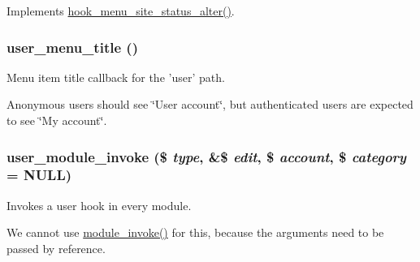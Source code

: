 \label{user_8module_ac2ced46ecfe66b365084a2b70acf2247}
Implements \hyperlink{group__hooks_ga3096be11aad61c8b342ade94789f6137}{hook\_\-menu\_\-site\_\-status\_\-alter()}. \hypertarget{user_8module_ad14ec01a9c57ce03d8e8ab16c2e0a400}{
\subsubsection[{user\_\-menu\_\-title}]{\setlength{\rightskip}{0pt plus 5cm}user\_\-menu\_\-title ()}}
\label{user_8module_ad14ec01a9c57ce03d8e8ab16c2e0a400}
Menu item title callback for the 'user' path.

Anonymous users should see \char`\"{}User account\char`\"{}, but authenticated users are expected to see \char`\"{}My account\char`\"{}. \hypertarget{user_8module_ab34c18f082e7d1c927b157da487c75b3}{
\subsubsection[{user\_\-module\_\-invoke}]{\setlength{\rightskip}{0pt plus 5cm}user\_\-module\_\-invoke (\$ {\em type}, \/  \&\$ {\em edit}, \/  \$ {\em account}, \/  \$ {\em category} = {\ttfamily NULL})}}
\label{user_8module_ab34c18f082e7d1c927b157da487c75b3}
Invokes a user hook in every module.

We cannot use \hyperlink{group__hooks_ga7547905cff161d057f9e71088ec67f05}{module\_\-invoke()} for this, because the arguments need to be passed by reference.


